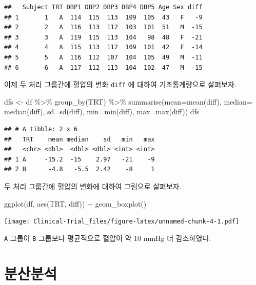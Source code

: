 \documentclass[
]{book}
\newenvironment{Shaded}{\begin{snugshade}}{\end{snugshade}}
\newcommand{\AttributeTok}[1]{\textcolor[rgb]{0.77,0.63,0.00}{#1}}
\newcommand{\FunctionTok}[1]{\textcolor[rgb]{0.00,0.00,0.00}{#1}}
\newcommand{\NormalTok}[1]{#1}
\newcommand{\OtherTok}[1]{\textcolor[rgb]{0.56,0.35,0.01}{#1}}
\newcommand{\SpecialCharTok}[1]{\textcolor[rgb]{0.00,0.00,0.00}{#1}}
\begin{document}
\begin{verbatim}
##   Subject TRT DBP1 DBP2 DBP3 DBP4 DBP5 Age Sex diff
## 1       1   A  114  115  113  109  105  43   F   -9
## 2       2   A  116  113  112  103  101  51   M  -15
## 3       3   A  119  115  113  104   98  48   F  -21
## 4       4   A  115  113  112  109  101  42   F  -14
## 5       5   A  116  112  107  104  105  49   M  -11
## 6       6   A  117  112  113  104  102  47   M  -15
\end{verbatim}

이제 두 처리 그룹간에 혈압의 변화 \texttt{diff} 에 대하여 기초통계량으로 살펴보자.

\begin{Shaded}
\begin{Highlighting}[]
\NormalTok{dfs }\OtherTok{\textless{}{-}}\NormalTok{ df }\SpecialCharTok{\%\textgreater{}\%} \FunctionTok{group\_by}\NormalTok{(TRT)  }\SpecialCharTok{\%\textgreater{}\%}  \FunctionTok{summarise}\NormalTok{(}\AttributeTok{mean=}\FunctionTok{mean}\NormalTok{(diff), }\AttributeTok{median=} \FunctionTok{median}\NormalTok{(diff), }\AttributeTok{sd=}\FunctionTok{sd}\NormalTok{(diff), }\AttributeTok{min=}\FunctionTok{min}\NormalTok{(diff), }\AttributeTok{max=}\FunctionTok{max}\NormalTok{(diff))}
\NormalTok{dfs}
\end{Highlighting}
\end{Shaded}

\begin{verbatim}
## # A tibble: 2 x 6
##   TRT    mean median    sd   min   max
##   <chr> <dbl>  <dbl> <dbl> <int> <int>
## 1 A     -15.2  -15    2.97   -21    -9
## 2 B      -4.8   -5.5  2.42    -8     1
\end{verbatim}

두 처리 그룹간에 혈압의 변화에 대하여 그림으로 살펴보자.

\begin{Shaded}
\begin{Highlighting}[]
\FunctionTok{ggplot}\NormalTok{(df, }\FunctionTok{aes}\NormalTok{(TRT, diff)) }\SpecialCharTok{+}  \FunctionTok{geom\_boxplot}\NormalTok{()}
\end{Highlighting}
\end{Shaded}

\texttt{[image: Clinical-Trial\_files/figure-latex/unnamed-chunk-4-1.pdf]}

\texttt{A} 그룹이 \texttt{B} 그룹보다 평균적으로 혈압이 약 10 mmHg 더 감소하였다.

\hypertarget{uxbd84uxc0b0uxbd84uxc11d}{%
\section{분산분석}\label{uxbd84uxc0b0uxbd84uxc11d}}
\end{document}
